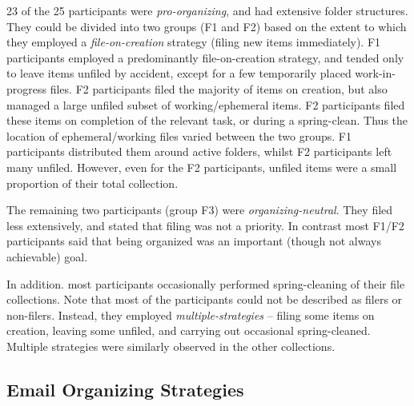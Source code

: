 23 of the 25 participants were \textit{pro-organizing}, and had extensive folder structures.  They could be divided into two groups (F1 and F2) based on the extent to which they employed a \textit{file-on-creation} strategy (filing new items immediately). F1 participants employed a predominantly file-on-creation strategy, and tended only to leave items unfiled by accident, except for a few temporarily placed work-in-progress files. F2 participants filed the majority of items on creation, but also managed a large unfiled subset of working/ephemeral items. F2 participants filed these items on completion of the relevant task, or during a spring-clean. Thus the location of ephemeral/working files varied between the two groups. F1 participants distributed them around active folders, whilst F2 participants left many unfiled. However, even for the F2 participants, unfiled items were a small proportion of their total collection.

The remaining two participants (group F3) were \textit{organizing-neutral}.  They filed less extensively, and stated that filing was not a priority.  In contrast most F1/F2 participants said that being organized was an important (though not always achievable) goal. 

In addition. most participants occasionally performed spring-cleaning of their file collections. Note that most of the participants could not be described as filers or non-filers.  Instead, they employed \textit{multiple-strategies} -- filing some items on creation, leaving some unfiled, and carrying out occasional spring-cleaned. Multiple strategies were similarly observed in the other collections. %






\subsection{Email Organizing Strategies}
\label{exp-study:Results-org-strategies-email}

